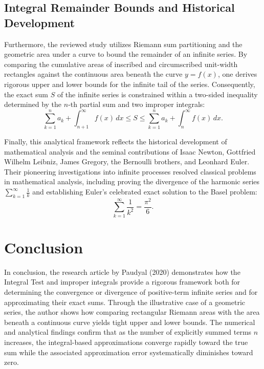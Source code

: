 \documentclass[11pt, a4paper]{article}
\begin{document}
\subsection{Integral Remainder Bounds and Historical Development}

Furthermore, the reviewed study utilizes Riemann sum partitioning and the geometric area under a curve to bound the remainder of an infinite series. By comparing the cumulative areas of inscribed and circumscribed unit-width rectangles against the continuous area beneath the curve $y = f(x)$, one derives rigorous upper and lower bounds for the infinite tail of the series. Consequently, the exact sum $S$ of the infinite series is constrained within a two-sided inequality determined by the $n$-th partial sum and two improper integrals:
\begin{equation}
    \sum_{k=1}^{n} a_{k} + \int_{n+1}^{\infty} f(x)\,dx \le S \le \sum_{k=1}^{n} a_{k} + \int_{n}^{\infty} f(x)\,dx.
    \label{eq:integral_bounds}
\end{equation}

Finally, this analytical framework reflects the historical development of mathematical analysis and the seminal contributions of Isaac Newton, Gottfried Wilhelm Leibniz, James Gregory, the Bernoulli brothers, and Leonhard Euler. Their pioneering investigations into infinite processes resolved classical problems in mathematical analysis, including proving the divergence of the harmonic series $\sum_{k=1}^{\infty} \frac{1}{k}$ and establishing Euler's celebrated exact solution to the Basel problem:
\begin{equation}
    \sum_{k=1}^{\infty} \frac{1}{k^{2}} = \frac{\pi^{2}}{6}.
\end{equation}

\section{Conclusion}

In conclusion, the research article by Paudyal (2020) demonstrates how the Integral Test and improper integrals provide a rigorous framework both for determining the convergence or divergence of positive-term infinite series and for approximating their exact sums. Through the illustrative case of a geometric series, the author shows how comparing rectangular Riemann areas with the area beneath a continuous curve yields tight upper and lower bounds. The numerical and analytical findings confirm that as the number of explicitly summed terms $n$ increases, the integral-based approximations converge rapidly toward the true sum while the associated approximation error systematically diminishes toward zero.
\end{document}
